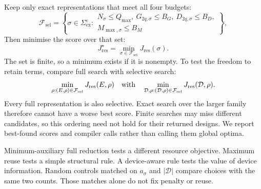 \documentclass[a4paper,onecolumn,11pt,unpublished]{quantumarticle}
\theoremstyle{remark}
\begin{document}
Keep only exact representations that meet all four budgets:
\begin{equation}
\mathcal F_{\mathrm{sel}}=\left\{\sigma\in\Sigma_{\mathrm{ex}}^\varepsilon:
\begin{array}{c}
N_\sigma\leq Q_{\max},\ G_{2q,\sigma}\leq B_G,\ D_{2q,\sigma}\leq B_D,\\
M_{\max,\sigma}\leq B_M
\end{array}\right\},
\label{eq:selection-feasible-set}
\end{equation}
Then minimise the score over that set:
\begin{equation}
J_{\mathrm{res}}^\star=\min_{\sigma\in\mathcal F_{\mathrm{sel}}}J_{\mathrm{res}}(\sigma).
\label{eq:selection-problem}
\end{equation}
The set is finite, so a minimum exists if it is nonempty.
To test the freedom to retain terms, compare full search with selective search:
\begin{equation}
\min_{\rho:(E,\rho)\in\mathcal F_{\mathrm{sel}}}J_{\mathrm{res}}(E,\rho)
\quad\hbox{with}\quad
\min_{\mathcal D,\rho:(\mathcal D,\rho)\in\mathcal F_{\mathrm{sel}}}J_{\mathrm{res}}(\mathcal D,\rho).
\label{eq:fair-full-comparison}
\end{equation}
Every full representation is also selective. Exact search over the larger
family therefore cannot have a worse best score.
Finite searches may miss different candidates, so this ordering need not
hold for their returned designs. We report best-found scores and compiler
calls rather than calling them global optima.

Minimum-auxiliary full reduction tests a different resource objective.
Maximum reuse tests a simple structural rule.
A device-aware rule tests the value of device information.
Random controls matched on $a_\sigma$ and $|\mathcal D|$ compare choices
with the same two counts. Those matches alone do not fix penalty or reuse.
\end{document}
